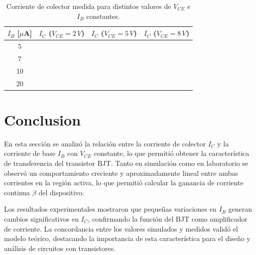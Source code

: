      \begin{table}[h!]
    \centering
    \small 
    \begin{tabular}{|c|c|c|c|}
    \hline
    $I_B$ [$\mu$A] & $I_C$ ($V_{CE} = 2\,V$) & $I_C$ ($V_{CE} = 5\,V$) & $I_C$ ($V_{CE} = 8\,V$) \\
    \hline
    5  &           &           &           \\
    \hline
    7  &           &           &           \\
    \hline
    10 &           &           &           \\
    \hline
    20 &           &           &           \\
    \hline
    \end{tabular}
    \caption{Corriente de colector medida para distintos valores de $V_{CE}$ e $I_B$ constantes.}
    \end{table}  
    \caption{Mediciones de $I_B$ y $V_{BE}$ para diferentes valores de $V_{BB}$. Valores de$I_B$ estimados según el comportamiento exponencial típico de la unión BE.}


\newpage

 \section{Conclusion}

    En esta sección se analizó la relación entre la corriente de colector $I_C$ y la corriente de base $I_B$ con $V_{CE}$ constante, lo que permitió obtener la característica de transferencia del transistor BJT. Tanto en simulación como en laboratorio se observó un comportamiento creciente y aproximadamente lineal entre ambas corrientes en la región activa, lo que permitió calcular la ganancia de corriente continua $\beta$ del dispositivo.

    Los resultados experimentales mostraron que pequeñas variaciones en $I_B$ generan cambios significativos en $I_C$, confirmando la función del BJT como amplificador de corriente. La concordancia entre los valores simulados y medidos validó el modelo teórico, destacando la importancia de esta característica para el diseño y análisis de circuitos con transistores.
